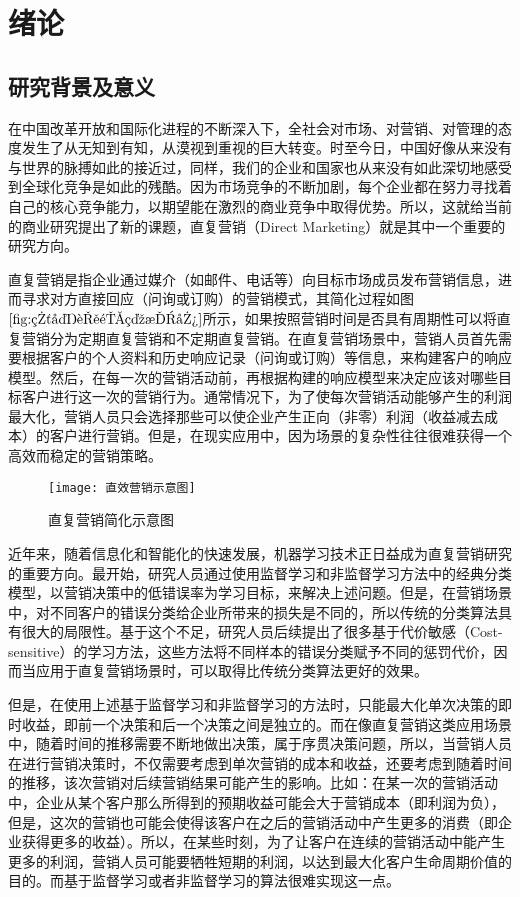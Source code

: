 \chapter{绪论}

\section{研究背景及意义}
在中国改革开放和国际化进程的不断深入下，全社会对市场、对营销、对管理的态度发生了从无知到有知，从漠视到重视的巨大转变。时至今日，中国好像从来没有与世界的脉搏如此的接近过，同样，我们的企业和国家也从来没有如此深切地感受到全球化竞争是如此的残酷。因为市场竞争的不断加剧，每个企业都在努力寻找着自己的核心竞争能力，以期望能在激烈的商业竞争中取得优势。所以，这就给当前的商业研究提出了新的课题，直复营销（Direct Marketing）就是其中一个重要的研究方向。

直复营销是指企业通过媒介（如邮件、电话等）向目标市场成员发布营销信息，进而寻求对方直接回应（问询或订购）的营销模式\citep{王广宇2013客户关系管理}，其简化过程如图$\ref{fig:直复营销示意图}$所示，如果按照营销时间是否具有周期性可以将直复营销分为定期直复营销和不定期直复营销。在直复营销场景中，营销人员首先需要根据客户的个人资料和历史响应记录（问询或订购）等信息，来构建客户的响应模型。然后，在每一次的营销活动前，再根据构建的响应模型来决定应该对哪些目标客户进行这一次的营销行为。通常情况下，为了使每次营销活动能够产生的利润最大化，营销人员只会选择那些可以使企业产生正向（非零）利润（收益减去成本）的客户进行营销。但是，在现实应用中，因为场景的复杂性往往很难获得一个高效而稳定的营销策略。

	\begin{figure}[htbp]
	\centering
	\texttt{[image: 直效营销示意图]}
	\caption{直复营销简化示意图}
	\label{fig:直复营销示意图}
	\end{figure}

近年来，随着信息化和智能化的快速发展，机器学习技术正日益成为直复营销研究的重要方向。最开始，研究人员通过使用监督学习和非监督学习方法中的经典分类模型，以营销决策中的低错误率为学习目标，来解决上述问题。但是，在营销场景中，对不同客户的错误分类给企业所带来的损失是不同的，所以传统的分类算法具有很大的局限性。基于这个不足，研究人员后续提出了很多基于代价敏感（Cost-sensitive）的学习方法，这些方法将不同样本的错误分类赋予不同的惩罚代价，因而当应用于直复营销场景时，可以取得比传统分类算法更好的效果。

但是，在使用上述基于监督学习和非监督学习的方法时，只能最大化单次决策的即时收益，即前一个决策和后一个决策之间是独立的。而在像直复营销这类应用场景中，随着时间的推移需要不断地做出决策，属于序贯决策问题，所以，当营销人员在进行营销决策时，不仅需要考虑到单次营销的成本和收益，还要考虑到随着时间的推移，该次营销对后续营销结果可能产生的影响。比如：在某一次的营销活动中，企业从某个客户那么所得到的预期收益可能会大于营销成本（即利润为负），但是，这次的营销也可能会使得该客户在之后的营销活动中产生更多的消费（即企业获得更多的收益）。所以，在某些时刻，为了让客户在连续的营销活动中能产生更多的利润，营销人员可能要牺牲短期的利润，以达到最大化客户生命周期价值的目的。而基于监督学习或者非监督学习的算法很难实现这一点。

